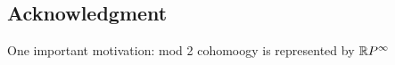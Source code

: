 
\subsection*{Acknowledgment}

\TBW

One important motivation: mod 2 cohomoogy is represented by $\mathbb{R} P^\infty$